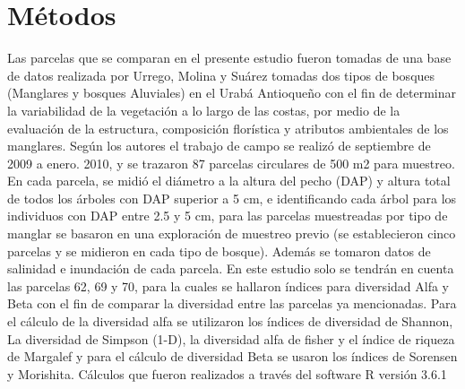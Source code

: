 \documentclass[conference,final,12pt,]{IEEEtran}
\begin{document}
\hypertarget{muxe9todos}{%
\section{Métodos}\label{muxe9todos}}

Las parcelas que se comparan en el presente estudio fueron tomadas de
una base de datos realizada por Urrego, Molina y Suárez tomadas dos
tipos de bosques (Manglares y bosques Aluviales) en el Urabá Antioqueño
con el fin de determinar la variabilidad de la vegetación a lo largo de
las costas, por medio de la evaluación de la estructura, composición
florística y atributos ambientales de los manglares. Según los
autores\citep{AB} el trabajo de campo se realizó de septiembre de 2009 a
enero. 2010, y se trazaron 87 parcelas circulares de 500 m2 para
muestreo. En cada parcela, se midió el diámetro a la altura del pecho
(DAP) y altura total de todos los árboles con DAP superior a 5 cm, e
identificando cada árbol para los individuos con DAP entre 2.5 y 5 cm,
para las parcelas muestreadas por tipo de manglar se basaron en una
exploración de muestreo previo (se establecieron cinco parcelas y se
midieron en cada tipo de bosque). Además se tomaron datos de salinidad e
inundación de cada parcela. En este estudio solo se tendrán en cuenta
las parcelas 62, 69 y 70, para la cuales se hallaron índices para
diversidad Alfa y Beta con el fin de comparar la diversidad entre las
parcelas ya mencionadas. Para el cálculo de la diversidad alfa se
utilizaron los índices de diversidad de Shannon, La diversidad de
Simpson (1-D), la diversidad alfa de fisher y el índice de riqueza de
Margalef y para el cálculo de diversidad Beta se usaron los índices de
Sorensen y Morishita. Cálculos que fueron realizados a través del
software R versión 3.6.1
\end{document}
